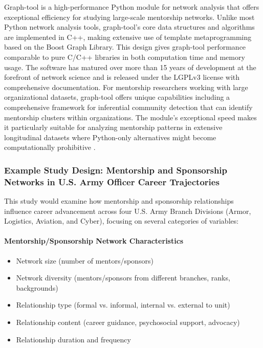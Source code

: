 \documentclass[main.tex]{subfiles}
\begin{document}
Graph-tool is a high-performance Python module for network analysis that offers exceptional efficiency for studying large-scale mentorship networks. Unlike most Python network analysis tools, graph-tool's core data structures and algorithms are implemented in C++, making extensive use of template metaprogramming based on the Boost Graph Library. This design gives graph-tool performance comparable to pure C/C++ libraries in both computation time and memory usage. The software has matured over more than 15 years of development at the forefront of network science and is released under the LGPLv3 license with comprehensive documentation. For mentorship researchers working with large organizational datasets, graph-tool offers unique capabilities including a comprehensive framework for inferential community detection that can identify mentorship clusters within organizations. The module's exceptional speed makes it particularly suitable for analyzing mentorship patterns in extensive longitudinal datasets where Python-only alternatives might become computationally prohibitive \cite{graphtool2023python}.

\subsubsection{Example Study Design: Mentorship and Sponsorship Networks in U.S. Army Officer Career Trajectories}


This study would examine how mentorship and sponsorship relationships influence career advancement across four U.S. Army Branch Divisions (Armor, Logistics, Aviation, and Cyber), focusing on several categories of variables:

\paragraph{Mentorship/Sponsorship Network Characteristics}
\begin{itemize}
\item Network size (number of mentors/sponsors)
\item Network diversity (mentors/sponsors from different branches, ranks, backgrounds)
\item Relationship type (formal vs. informal, internal vs. external to unit)
\item Relationship content (career guidance, psychosocial support, advocacy)
\item Relationship duration and frequency
\end{itemize}
\end{document}
